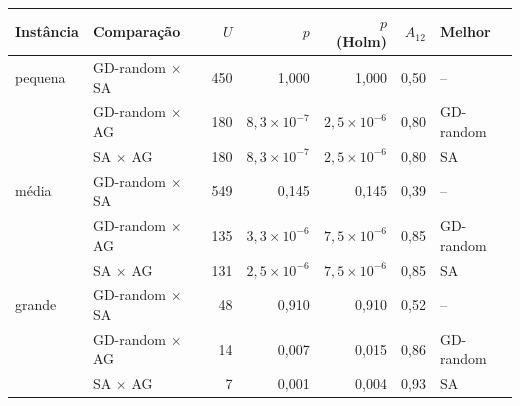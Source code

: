 \begin{tabular}{llrrrrl}
\toprule
Instância & Comparação & $U$ & $p$ & $p$ (Holm) & $A_{12}$ & Melhor \\
\midrule
pequena & GD-random $\times$ SA & 450 & 1,000 & 1,000 & 0,50 & -- \\
 & GD-random $\times$ AG & 180 & $8,3\times10^{-7}$ & $2,5\times10^{-6}$ & 0,80 & GD-random \\
 & SA $\times$ AG & 180 & $8,3\times10^{-7}$ & $2,5\times10^{-6}$ & 0,80 & SA \\
\midrule
média & GD-random $\times$ SA & 549 & 0,145 & 0,145 & 0,39 & -- \\
 & GD-random $\times$ AG & 135 & $3,3\times10^{-6}$ & $7,5\times10^{-6}$ & 0,85 & GD-random \\
 & SA $\times$ AG & 131 & $2,5\times10^{-6}$ & $7,5\times10^{-6}$ & 0,85 & SA \\
\midrule
grande & GD-random $\times$ SA & 48 & 0,910 & 0,910 & 0,52 & -- \\
 & GD-random $\times$ AG & 14 & 0,007 & 0,015 & 0,86 & GD-random \\
 & SA $\times$ AG & 7 & 0,001 & 0,004 & 0,93 & SA \\
\bottomrule
\end{tabular}
